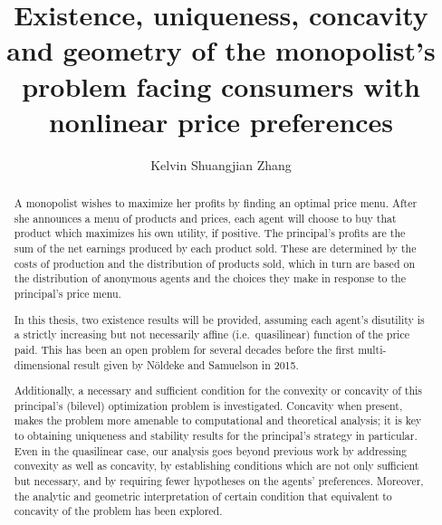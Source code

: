 \documentclass{ut-thesis}[10pt]
\author{Kelvin Shuangjian Zhang}
\title{Existence, uniqueness, concavity and geometry of the monopolist's problem facing consumers with nonlinear price preferences}
\theoremstyle{plain}
\theoremstyle{definition}
\theoremstyle{remark}
\numberwithin{equation}{section}
\begin{document}
\begin{preliminary}

\maketitle

\cleardoublepage

\begin{abstract}

	A monopolist wishes to maximize her profits by finding an optimal price menu. After she announces a menu of products and prices, each agent will choose to buy that product which maximizes his own utility, if positive. 
	The principal's profits are the sum of the net earnings produced by each product sold.  
	These are determined by the costs of production and the distribution of products sold, which in turn are based on the distribution of anonymous agents and
	the choices they make in response to the principal's price menu.  
	
	In this thesis, two existence results will be provided, assuming each agent's disutility is a strictly increasing but not necessarily affine (i.e.\ quasilinear) function of the price paid. This has been an open problem for several decades before the first multi-dimensional result given by N\"oldeke and Samuelson in 2015.
	
	Additionally, a necessary and sufficient condition for the convexity or concavity of this principal's (bilevel) optimization problem is investigated. 
	Concavity when present, makes the problem more amenable to 
	computational and theoretical analysis;  it is key to obtaining uniqueness and stability results for the principal's strategy in particular.  Even in the quasilinear case, our analysis goes beyond previous work by addressing convexity as well as concavity,  by establishing conditions which are not only sufficient but necessary,  and by requiring fewer hypotheses on the agents' preferences.	Moreover, the analytic and geometric interpretation of certain condition that equivalent to concavity of the problem has been explored.
	

\end{abstract}
\end{preliminary}
\end{document}
